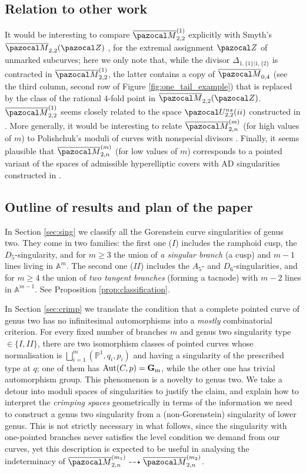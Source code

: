 \documentclass{compositio}
\newcommand{\PP}{\mathbb P}
\newcommand{\Aaff}{\mathbb A}
\newcommand{\oM}{\overline{\pazocal M}}
\newcommand{\Gm}{\mathbb{G}_{\rm{m}}}
\newcommand{\Aut}{\operatorname{Aut}}
\theoremstyle{plain}
\theoremstyle{definition}
\theoremstyle{remark}
\begin{document}
\subsection{Relation to other work} It would be interesting to compare $\oM_{2,2}^{(1)}$ explicitly with Smyth's $\oM_{2,2}(\pazocal Z)$ \cite{SMY-towards}, for the extremal assignment $\pazocal Z$ of unmarked subcurves; here we only note that, while the divisor $\Delta_{1,\{1\}|1,\{2\}}$ is contracted in $\oM_{2,2}^{(1)}$, the latter contains a copy of $\oM_{0,4}$ (see the third column, second row of Figure \ref{fig:one_tail_example}) that is replaced by the class of the rational $4$-fold point in $\oM_{2,2}(\pazocal Z)$. $\oM_{2,2}^{(1)}$ seems closely related to the space $\pazocal U^{ns}_{2,2}(ii)$ constructed in \cite{PolishchukJohnson}. More generally, it would be interesting to relate $\oM_{2,n}^{(m)}$ (for high values of $m$) to Polishchuk's moduli of curves with nonspecial divisors \cite{Polishchuk-nonspecial}. Finally, it seems plausible that $\oM_{2,n}^{(m)}$ (for low values of $m$) corresponds to a pointed variant of the spaces of admissible hyperelliptic covers with AD singularities constructed in \cite{Fedorchuk-hyperellipticAD}.

\subsection{Outline of results and plan of the paper} In Section \ref{sec:sing} we classify all the Gorenstein curve singularities of genus two. They come in two families: the first one ($I$) includes the ramphoid cusp, the $D_5$-singularity, and for $m\geq 3$ the union of \emph{a singular branch} (a cusp) and $m-1$ lines living in $\Aaff^m$. The second one ($I\!I$) includes the $A_5$- and $D_6$-singularities, and for $m\geq 4$ the union of \emph{two tangent branches} (forming a tacnode) with $m-2$ lines in $\Aaff^{m-1}$. See Proposition \ref{prop:classification}.

In Section \ref{sec:crimp} we translate the condition that a complete pointed curve of genus two has no infinitesimal automorphisms into a \emph{mostly} combinatorial criterion. For every fixed number of branches $m$ and genus two singularity type $\in\{I,I\!I\}$, there are two isomorphism classes of pointed curves whose normalisation is $\bigsqcup_{i=1}^m(\PP^1,q_i,p_i)$ and having a singularity of the prescribed type at $q$; one of them has $\Aut(C,p)=\Gm$, while the other one has trivial automorphism group. This phenomenon is a novelty to genus two. We take a detour into moduli spaces of singularities to justify the claim, and explain how to interpret the \emph{crimping spaces} geometrically in terms of the information we need to construct a genus two singularity from a (non-Gorenstein) singularity of lower genus. This is not strictly necessary in what follows, since the singularity with one-pointed branches never satisfies the level condition we demand from our curves, yet this description is expected to be useful in analysing the indeterminacy of $\oM_{2,n}^{(m_1)}\dashrightarrow\oM_{2,n}^{(m_2)}$.
\end{document}
